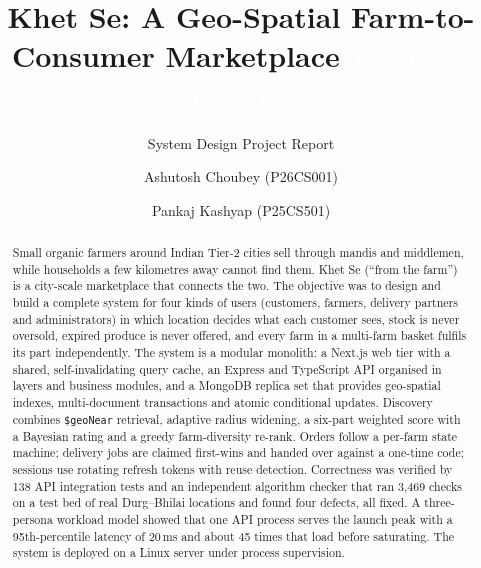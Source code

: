 \documentclass[manuscript,screen,review]{acmart}
\begin{document}
\title[Khet Se]{Khet Se: A Geo-Spatial Farm-to-Consumer Marketplace\texorpdfstring{\textcolor{white}{ AI used: about 90\%}}{}}
\subtitle{System Design Project Report}

\author{Ashutosh Choubey (P26CS001)}

\author{Pankaj Kashyap (P25CS501)}

\renewcommand{\shortauthors}{Choubey and Kashyap}

\begin{abstract}
Small organic farmers around Indian Tier-2 cities sell through mandis and middlemen, while households a few kilometres away cannot find them. Khet Se (``from the farm'') is a city-scale marketplace that connects the two. The objective was to design and build a complete system for four kinds of users (customers, farmers, delivery partners and administrators) in which location decides what each customer sees, stock is never oversold, expired produce is never offered, and every farm in a multi-farm basket fulfils its part independently. The system is a modular monolith: a Next.js web tier with a shared, self-invalidating query cache, an Express and TypeScript API organised in layers and business modules, and a MongoDB replica set that provides geo-spatial indexes, multi-document transactions and atomic conditional updates. Discovery combines \texttt{\$geoNear} retrieval, adaptive radius widening, a six-part weighted score with a Bayesian rating and a greedy farm-diversity re-rank. Orders follow a per-farm state machine; delivery jobs are claimed first-wins and handed over against a one-time code; sessions use rotating refresh tokens with reuse detection. Correctness was verified by 138 API integration tests and an independent algorithm checker that ran 3{,}469 checks on a test bed of real Durg--Bhilai locations and found four defects, all fixed. A three-persona workload model showed that one API process serves the launch peak with a 95th-percentile latency of 20\,ms and about 45 times that load before saturating. The system is deployed on a Linux server under process supervision.
\end{abstract}
\end{document}
